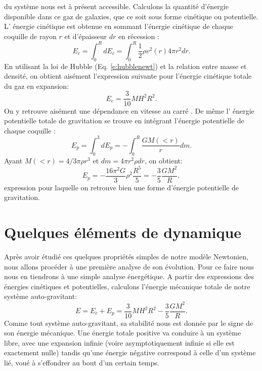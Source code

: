  du système nous est à présent accessible. Calculons la quantité d'énergie disponible dans ce gaz de galaxies, que ce soit sous forme cinétique ou potentielle. L' énergie cinétique  est obtenue en sommant l'énergie cinétique de chaque coquille de rayon $r$ et d'épaisseur $dr$ en récession :
\begin{equation}
E_c=\int_0^R dE_c=\int_0^R \frac{1}{2}\rho  v^2(r) 4\pi r^2  dr.
\end{equation}
En utilisant la loi de Hubble (Eq. \ref{e:hubblenewt}) et la relation entre masse et densité, on obtient aisément l'expression suivante pour l'énergie cinétique totale du gaz en expansion:
\begin{equation}
E_c=\frac{3}{10} M H^2 R^2.
\end{equation}
On y retrouve aisément une dépendance en vitesse au carré . De même l' énergie potentielle  totale de gravitation se trouve en intégrant l'énergie potentielle de chaque coquille :
\begin{equation}
E_p=\int_0^3 dE_p=-\int_0^R \frac{GM(<r)}{r}dm.
\end{equation}
Ayant $M(<r)=4/3\pi \rho r^3$ et $dm= 4\pi r^2 \rho dr$, on obtient:
\begin{equation}
E_p=-\frac{16 \pi^2 G}{3} \rho^2 \frac{R^5}{5}= -\frac{3}{5}\frac{GM^2}{R},
\end{equation} 
expression pour laquelle on retrouve bien une forme d'énergie potentielle de gravitation.

\section{Quelques éléments de dynamique}
Après avoir étudié ces quelques propriétés simples de notre modèle Newtonien, nous allons procéder à une première analyse de son évolution. Pour ce faire nous nous en tiendrons à une simple analyse énergétique. A partir des expressions des énergies cinétiques et potentielles, calculons l'énergie mécanique  totale de notre système auto-gravitant:
\begin{equation}
E=E_c+E_p=\frac{3}{10} M H^2 R^2 - \frac{3}{5}\frac{GM^2}{R}.
\end{equation}
Comme tout système auto-gravitant, sa stabilité nous est donnée par le signe de son énergie mécanique. Une énergie totale positive va conduire à un système libre, avec une expansion infinie (voire asymptotiquement infinie si elle est exactement nulle) tandis qu'une énergie négative correspond à celle d'un système lié, voué à s'effondrer au bout d'un certain temps.

